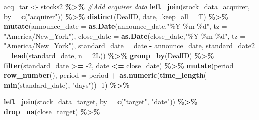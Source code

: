 \documentclass[
]{article}
\newenvironment{Shaded}{\begin{snugshade}}{\end{snugshade}}
\newcommand{\CommentTok}[1]{\textcolor[rgb]{0.56,0.35,0.01}{\textit{#1}}}
\newcommand{\DataTypeTok}[1]{\textcolor[rgb]{0.13,0.29,0.53}{#1}}
\newcommand{\DecValTok}[1]{\textcolor[rgb]{0.00,0.00,0.81}{#1}}
\newcommand{\KeywordTok}[1]{\textcolor[rgb]{0.13,0.29,0.53}{\textbf{#1}}}
\newcommand{\NormalTok}[1]{#1}
\newcommand{\OperatorTok}[1]{\textcolor[rgb]{0.81,0.36,0.00}{\textbf{#1}}}
\newcommand{\StringTok}[1]{\textcolor[rgb]{0.31,0.60,0.02}{#1}}
\begin{document}
\begin{Shaded}
\begin{Highlighting}[]
\NormalTok{acq\_tar \textless{}{-}}\StringTok{ }\NormalTok{stocks2 }\OperatorTok{\%\textgreater{}\%}
\StringTok{  }
\StringTok{  }\CommentTok{\#Add acquirer data}
\StringTok{  }\KeywordTok{left\_join}\NormalTok{(stock\_data\_acquirer, }\DataTypeTok{by =} \KeywordTok{c}\NormalTok{(}\StringTok{"acquirer"}\NormalTok{)) }\OperatorTok{\%\textgreater{}\%}
\StringTok{  }\KeywordTok{distinct}\NormalTok{(DealID, date, }\DataTypeTok{.keep\_all =}\NormalTok{ T) }\OperatorTok{\%\textgreater{}\%}\StringTok{ }
\StringTok{  }\KeywordTok{mutate}\NormalTok{(}\DataTypeTok{announce\_date =} \KeywordTok{as.Date}\NormalTok{(announce\_date,}\StringTok{"\%Y{-}\%m{-}\%d"}\NormalTok{, }\DataTypeTok{tz =} \StringTok{"America/New\_York"}\NormalTok{),}
         \DataTypeTok{close\_date =} \KeywordTok{as.Date}\NormalTok{(close\_date,}\StringTok{"\%Y{-}\%m{-}\%d"}\NormalTok{, }\DataTypeTok{tz =} \StringTok{"America/New\_York"}\NormalTok{),}
         \DataTypeTok{standard\_date =}\NormalTok{ date }\OperatorTok{{-}}\StringTok{ }\NormalTok{announce\_date,}
         \DataTypeTok{standard\_date2 =} \KeywordTok{lead}\NormalTok{(standard\_date, }\DataTypeTok{n =}\NormalTok{ 2L)) }\OperatorTok{\%\textgreater{}\%}\StringTok{ }
\StringTok{  }\KeywordTok{group\_by}\NormalTok{(DealID) }\OperatorTok{\%\textgreater{}\%}\StringTok{ }
\StringTok{  }\KeywordTok{filter}\NormalTok{(standard\_date }\OperatorTok{\textgreater{}=}\StringTok{ }\DecValTok{{-}2}\NormalTok{,}
\NormalTok{         date }\OperatorTok{\textless{}=}\StringTok{ }\NormalTok{close\_date) }\OperatorTok{\%\textgreater{}\%}\StringTok{ }
\StringTok{  }\KeywordTok{mutate}\NormalTok{(}\DataTypeTok{period =} \KeywordTok{row\_number}\NormalTok{(),}
         \DataTypeTok{period =}\NormalTok{ period }\OperatorTok{+}\StringTok{ }\KeywordTok{as.numeric}\NormalTok{(}\KeywordTok{time\_length}\NormalTok{( }\KeywordTok{min}\NormalTok{(standard\_date), }\StringTok{"days"}\NormalTok{)) }\DecValTok{{-}1}\NormalTok{) }\OperatorTok{\%\textgreater{}\%}\StringTok{ }

\StringTok{  }\KeywordTok{left\_join}\NormalTok{(stock\_data\_target, }\DataTypeTok{by =} \KeywordTok{c}\NormalTok{(}\StringTok{"target"}\NormalTok{, }\StringTok{"date"}\NormalTok{)) }\OperatorTok{\%\textgreater{}\%}
\StringTok{  }\KeywordTok{drop\_na}\NormalTok{(close\_target) }\OperatorTok{\%\textgreater{}\%}


\end{Highlighting}
\end{Shaded}
\end{document}
